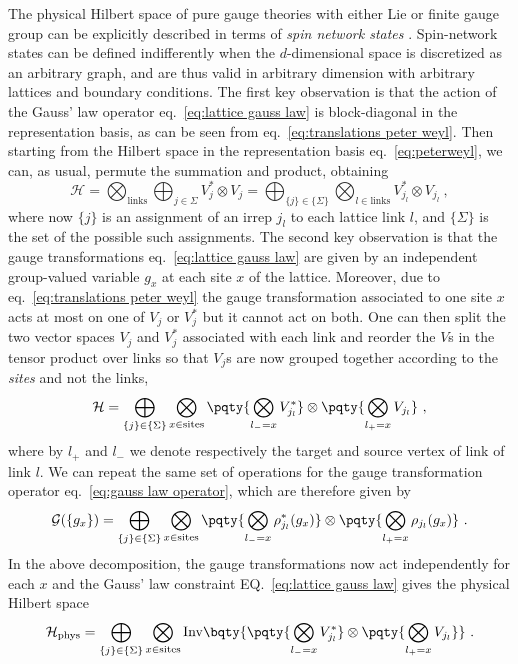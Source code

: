 The physical Hilbert space of pure gauge theories with either Lie or finite gauge group can be explicitly described in terms of \textit{spin network states} \cite{baez1996spinnetworks, burgio2000physical}.
Spin-network states can be defined indifferently when the $d$-dimensional space is discretized as an arbitrary graph, and are thus valid in arbitrary dimension with arbitrary lattices and boundary conditions.
The first key observation is that the action of the Gauss' law operator eq.~\eqref{eq:lattice gauss law} is block-diagonal in the representation basis, as can be seen from eq.~\eqref{eq:translations peter weyl}.
Then starting from the Hilbert space in the representation basis eq.~\eqref{eq:peterweyl}, we can, as usual, permute the summation and product, obtaining
\begin{equation}
    \label{eq:hilbert space permuted}
    \mathcal{H} = \bigotimes_{\mathrm{links}} \bigoplus_{j \in \Sigma} V_j^* \otimes V_j=\bigoplus_{\{j\} \in \{\Sigma\}} \bigotimes_{l \in \mathrm{links}}  V_{j_l}^* \otimes V_{j_l} \ ,
\end{equation}
where now $\{j\}$ is an assignment of an irrep $j_l$ to each lattice link $l$, and $\{\Sigma\}$ is the set of the possible such assignments.
The second key observation is that the gauge transformations eq.~\eqref{eq:lattice gauss law} are given by an independent group-valued variable $g_x$ at each site $x$ of the lattice.
Moreover, due to eq.~\eqref{eq:translations peter weyl} the gauge transformation associated to one site $x$ acts at most on one of $V_j$ or $V_j^*$ but it cannot act on both.
One can then split the two vector spaces $V_j$ and $V_j^*$ associated with each link and reorder the $V$s in the tensor product over links so that $V_j$s are now grouped together according to the \textit{sites} and not the links,
\begin{equation}
    \mathcal{H} = \bigoplus_{\{j\} \in \{\Sigma\}} \bigotimes_{x \in \mathrm{sites}} \pqty{\bigotimes_{l_-=x} V_{j_l}^*} \otimes \pqty{\bigotimes_{l_+=x} V_{j_l} }\ ,
\end{equation}
where by $l_+$ and $l_-$ we denote respectively the target and source vertex of link of link $l$.
We can repeat the same set of operations for the gauge transformation operator eq.~\eqref{eq:gauss law operator}, which are therefore given by
\begin{equation}
    \mathcal{G}(\{g_x\}) = \bigoplus_{\{j\} \in \{\Sigma\}} \bigotimes_{x \in \mathrm{sites}} \pqty{\bigotimes_{l_-=x} \rho_{j_l}^*(g_x)} \otimes \pqty{\bigotimes_{l_+=x} \rho_{j_l}(g_x) }\ .
\end{equation}
In the above decomposition, the gauge transformations now act independently for each $x$ and the Gauss' law constraint EQ.~\eqref{eq:lattice gauss law} gives the physical Hilbert space
\begin{equation}
    \label{eq:spin network Hilbert space}
    \mathcal{H}_{\mathrm{phys}} = \bigoplus_{\{j\} \in \{\Sigma\}} \bigotimes_{x \in \mathrm{sites}} \mathrm{Inv}\bqty{\pqty{\bigotimes_{l_-=x} V_{j_l}^*} \otimes \pqty{\bigotimes_{l_+=x} V_{j_l} }} \ .
\end{equation}



